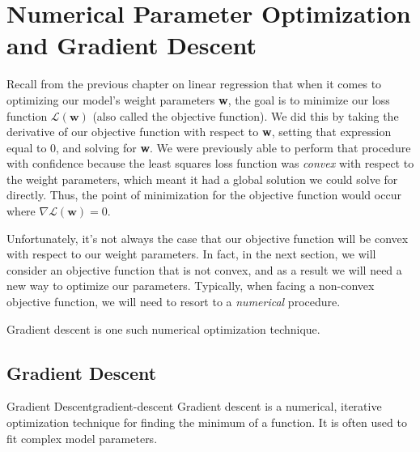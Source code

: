 \section{Numerical Parameter Optimization and Gradient Descent}
Recall from the previous chapter on linear regression that when it comes to optimizing our model's weight parameters \textbf{w}, the goal is to minimize our loss function $\mathcal{L}(\textbf{w})$ (also called the objective function). We did this by taking the derivative of our objective function with respect to \textbf{w}, setting that expression equal to 0, and solving for \textbf{w}. We were previously able to perform that procedure with confidence because the least squares loss function was \textit{convex} with respect to the weight parameters, which meant it had a global solution we could solve for directly. Thus, the point of minimization for the objective function would occur where $\nabla \mathcal{L}(\textbf{w}) = 0$.

Unfortunately, it's not always the case that our objective function will be convex with respect to our weight parameters. In fact, in the next section, we will consider an objective function that is not convex, and as a result we will need a new way to optimize our parameters. Typically, when facing a non-convex objective function, we will need to resort to a \textit{numerical} procedure.


Gradient descent is one such numerical optimization technique.

\subsection{Gradient Descent}
\begin{definition}{Gradient Descent}{gradient-descent}
Gradient descent is a numerical, iterative optimization technique for finding the minimum of a function. It is often used to fit complex model parameters.
\end{definition}

